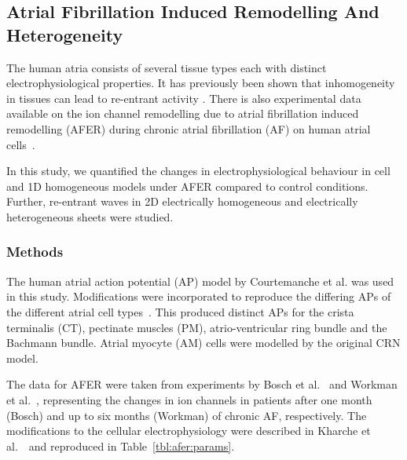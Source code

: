 \subsection{Atrial Fibrillation Induced Remodelling And Heterogeneity}

The human atria consists of several tissue types each with distinct
electrophysiological properties.  It has previously been shown that
inhomogeneity in tissues can lead to re-entrant activity
\cite{Bernus2005, Coronel1992, Kumagai1997}.  There is also experimental
data available on the ion channel remodelling due to atrial
fibrillation induced remodelling (AFER) during chronic atrial
fibrillation (AF) on human atrial cells~\cite{Bosch1999,Workman2001}.

In this study, we quantified the changes in electrophysiological
behaviour in cell and 1D homogeneous models under AFER compared to control
conditions.  Further, re-entrant waves in 2D electrically homogeneous
and electrically heterogeneous sheets were studied.

\subsubsection{Methods}

The human atrial action potential (AP) model by Courtemanche et
al.\cite{CRN98} was used in this study.  Modifications were
incorporated to reproduce the differing APs of the different atrial cell
types~\cite{Seemann2006}.  This produced distinct APs for the
crista terminalis (CT), pectinate muscles (PM), atrio-ventricular ring
bundle and the Bachmann bundle.  Atrial myocyte (AM) cells were modelled
by the original CRN model.

The data for AFER were taken from experiments by Bosch et
al.~\cite{Bosch1999} and Workman et al.~\cite{Workman2001}, representing
the changes in ion channels in patients after one month (Bosch)
and up to six months (Workman) of chronic AF, respectively.  The
modifications to the cellular electrophysiology were described in
Kharche et al.~\cite{Kharche2007}\ and reproduced in Table~\ref{tbl:afer:params}.


